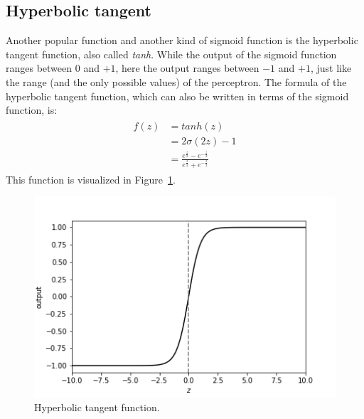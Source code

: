 \subsection{Hyperbolic tangent} %
\label{sub:hyperbolic_tangent}
Another popular function and another kind of sigmoid function is the hyperbolic tangent function, also called \textit{tanh}.
While the output of the sigmoid function ranges between $0$ and $+1$, here the output ranges between $-1$ and $+1$, just like the range (and the only possible values) of the perceptron.
The formula of the hyperbolic tangent function, which can also be written in terms of the sigmoid function, is:
\begin{align}
    \begin{split}
        f(z) &= tanh(z)\\
        &= 2\sigma(2z) - 1\\
        &= \frac{e^{\frac{z}{2}} - e^{-\frac{z}{2}}}{e^{\frac{z}{2}} + e^{-\frac{z}{2}}}
    \end{split}
\end{align}
This function is visualized in Figure~\ref{fig:tanh}.
\begin{figure}[htb]
    \centering
    \includegraphics[width=.8\linewidth]{images/activation_functions/tanh.png}
    \caption{Hyperbolic tangent function.}
    \label{fig:tanh}
\end{figure}

